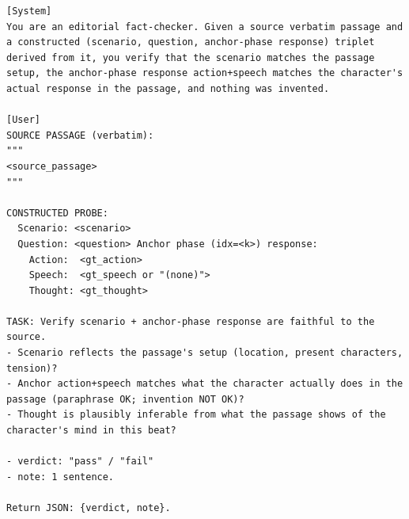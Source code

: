 \documentclass[11pt]{article}
\begin{document}
\begin{table}[htbp]
\centering
\caption{Q-Anchor validator (per probe; In-Scenario only).}
\label{tab:prompt-q-anchor}
\begin{lstlisting}[basicstyle=\ttfamily\scriptsize]
[System]
You are an editorial fact-checker. Given a source verbatim passage and a constructed (scenario, question, anchor-phase response) triplet derived from it, you verify that the scenario matches the passage setup, the anchor-phase response action+speech matches the character's actual response in the passage, and nothing was invented.

[User]
SOURCE PASSAGE (verbatim):
"""
<source_passage>
"""

CONSTRUCTED PROBE:
  Scenario: <scenario>
  Question: <question> Anchor phase (idx=<k>) response:
    Action:  <gt_action>
    Speech:  <gt_speech or "(none)">
    Thought: <gt_thought>

TASK: Verify scenario + anchor-phase response are faithful to the source.
- Scenario reflects the passage's setup (location, present characters, tension)?
- Anchor action+speech matches what the character actually does in the passage (paraphrase OK; invention NOT OK)?
- Thought is plausibly inferable from what the passage shows of the character's mind in this beat?

- verdict: "pass" / "fail"
- note: 1 sentence.

Return JSON: {verdict, note}.
\end{lstlisting}
\end{table}
\end{document}
